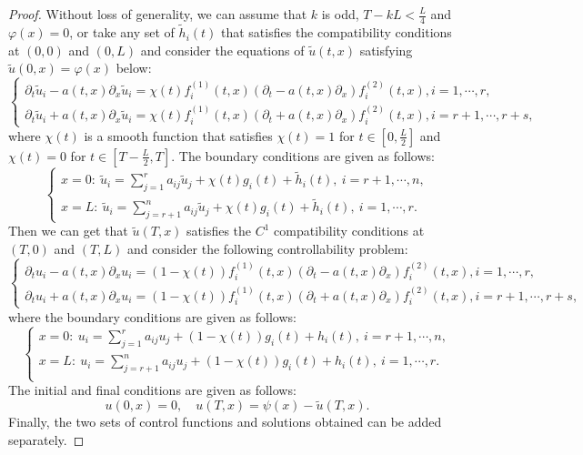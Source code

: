 \documentclass[a4paper,reqno,11pt]{amsart}
\numberwithin{equation}{section} %
\begin{document}
\begin{proof}
	Without loss of generality, we can assume that $k$ is odd, $T-kL < \frac{L}{4}$ and $\varphi (x)=0$, or take any set of $\tilde{h}_i(t)$ that satisfies the compatibility conditions at $(0,0)$ and $(0,L)$ and consider the equations of $\tilde{u}(t,x)$ satisfying $\tilde{u}(0,x)= \varphi(x)$ below:
	\begin{equation}\label{e4}
		\left\{\begin{array}{l}
		\partial_t \tilde{u} _i- a(t,x)\partial_x \tilde{u} _i=\chi (t)f^{(1)}_i(t,x)(\partial_t - a(t,x)\partial_x)f^{(2)}_i(t,x), i=1, \cdots, r, \\
		\partial_t \tilde{u} _i+ a(t,x)\partial_x \tilde{u} _i=\chi (t)f^{(1)}_i(t,x)(\partial_t + a(t,x)\partial_x)f^{(2)}_i(t,x), i=r+1, \cdots, r+s,
		\end{array}\right.
	\end{equation}
where $\chi (t)$ is a smooth function that satisfies $\chi (t)=1$ for $t\in [0,\frac{L}{2}]$ and $\chi (t)=0$ for $t\in [T-\frac{L}{2},T]$. The boundary conditions are given as follows:
\begin{equation}\label{e5}
		\left\{ \begin{array}{l}
		x=0:\ \tilde{u} _i=\sum_{j=1}^r{a_{ij}\tilde{u} _j + \chi (t)g_i(t) + \tilde{h} _i\left( t \right) ,\ i=r+1,\cdots ,n,}\\
		x=L:\ \tilde{u} _i=\sum_{j=r+1}^n{a_{ij}\tilde{u} _j +\chi (t)g_i(t) + \tilde{h} _i\left( t \right) ,\ i=1,\cdots ,r.}
		\end{array} \right. 
	\end{equation}
Then we can get that $\tilde{u}(T,x)$ satisfies the $C^1$ compatibility conditions at $(T,0)$ and $(T,L)$ and consider the following controllability problem:
	\begin{equation}\label{e6}
		\left\{\begin{array}{l}
		\partial_t u_i- a(t,x)\partial_x u_i=(1-\chi (t))f^{(1)}_i(t,x)(\partial_t - a(t,x)\partial_x)f^{(2)}_i(t,x), i=1, \cdots, r, \\
		\partial_t u_i+ a(t,x)\partial_x u_i=(1-\chi (t))f^{(1)}_i(t,x)(\partial_t + a(t,x)\partial_x)f^{(2)}_i(t,x), i=r+1, \cdots, r+s,
		\end{array}\right.
	\end{equation}
where the boundary conditions are given as follows:
\begin{equation}\label{e7}
		\left\{ \begin{array}{l}
		x=0:\ u_i=\sum_{j=1}^r{a_{ij}u_j + (1-\chi (t))g_i(t) + h_i\left( t \right) ,\ i=r+1,\cdots ,n,}\\
		x=L:\ u_i=\sum_{j=r+1}^n{a_{ij}u_j +(1-\chi (t))g_i(t) + h_i\left( t \right) ,\ i=1,\cdots ,r.}\\
		\end{array} \right. 
	\end{equation}
The initial and final conditions are given as follows:
\begin{equation}\label{e8}
		u(0,x)=0 ,\quad u(T,x)=\psi (x)- \tilde{u}(T,x).
	\end{equation}
Finally, the two sets of control functions and solutions obtained can be added separately.


\end{proof}
\end{document}

